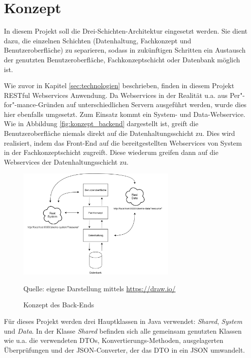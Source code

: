 \section{Konzept}
\label{sec:konzept}

In diesem Projekt soll die Drei-Schichten-Architektur eingesetzt werden.
Sie dient dazu, die einzelnen Schichten (Datenhaltung, Fachkonzept und Benutzeroberfläche) zu separieren, sodass in zukünftigen Schritten ein Austausch der genutzten Benutzeroberfläche, Fachkonzeptschicht oder Datenbank möglich ist.

Wie zuvor in Kapitel \vref{sec:technologien} beschrieben, finden in diesem Projekt \acs{REST}ful Webservices Anwendung.
Da Webservices in der Realität u.a. aus Per"-for"-mance-Gründen auf unterschiedlichen Servern ausgeführt werden, wurde dies hier ebenfalls umgesetzt.
Zum Einsatz kommt ein System- und Data-Webservice.
Wie in Abbildung \vref{fig:konzept_backend} dargestellt ist, greift die Benutzeroberfläche niemals direkt auf die Datenhaltungsschicht zu.
Dies wird realisiert, indem das Front-End auf die bereitgestellten Webservices von System in der Fachkonzeptschicht zugreift.
Diese wiederum greifen dann auf die Webservices der Datenhaltungsschicht zu.

\begin{figure}[ht]
	\centering
	\includegraphics[width=0.7\textwidth]{img/backend/rest}
	\captionsetup{format=hang}
	\caption{Konzept des Back-Ends}
	\small Quelle: eigene Darstellung mittels \url{https://draw.io/}
	\label{fig:konzept_backend}
	\end{figure}

Für dieses Projekt werden drei Hauptklassen in Java verwendet: \textit{Shared}, \textit{System} und \textit{Data}.
In der Klasse \textit{Shared} befinden sich alle gemeinsam genutzten Klassen wie u.a. die verwendeten \acp{DTO}, Konvertierungs-Methoden, ausgelagerten Überprüfungen und der \acs{JSON}-Converter, der das \acs{DTO} in ein \acs{JSON} umwandelt.

